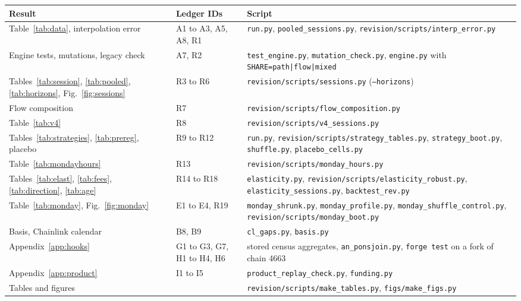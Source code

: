 \documentclass[11pt]{article}
\begin{document}
\begin{center}
\small
\begin{tabular}{>{\raggedright\arraybackslash}p{4.4cm}>{\raggedright\arraybackslash}p{2.2cm}>{\raggedright\arraybackslash}p{8.4cm}}
\toprule
Result & Ledger IDs & Script \\
\midrule
Table~\ref{tab:data}, interpolation error & A1 to A3, A5, A8, R1 & \texttt{run.py}, \texttt{pooled\_sessions.py}, \texttt{revision/scripts/interp\_error.py} \\
Engine tests, mutations, legacy check & A7, R2 & \texttt{test\_engine.py}, \texttt{mutation\_check.py}, \texttt{engine.py} with \texttt{SHARE=path|flow|mixed} \\
Tables~\ref{tab:session}, \ref{tab:pooled}, \ref{tab:horizons}, Fig.~\ref{fig:sessions} & R3 to R6 & \texttt{revision/scripts/sessions.py} (\texttt{--horizons}) \\
Flow composition & R7 & \texttt{revision/scripts/flow\_composition.py} \\
Table~\ref{tab:v4} & R8 & \texttt{revision/scripts/v4\_sessions.py} \\
Tables~\ref{tab:strategies}, \ref{tab:prereg}, placebo & R9 to R12 & \texttt{run.py}, \texttt{revision/scripts/strategy\_tables.py}, \texttt{strategy\_boot.py}, \texttt{shuffle.py}, \texttt{placebo\_cells.py} \\
Table~\ref{tab:mondayhours} & R13 & \texttt{revision/scripts/monday\_hours.py} \\
Tables~\ref{tab:elast}, \ref{tab:fees}, \ref{tab:direction}, \ref{tab:age} & R14 to R18 & \texttt{elasticity.py}, \texttt{revision/scripts/elasticity\_robust.py}, \texttt{elasticity\_sessions.py}, \texttt{backtest\_rev.py} \\
Table~\ref{tab:monday}, Fig.~\ref{fig:monday} & E1 to E4, R19 & \texttt{monday\_shrunk.py}, \texttt{monday\_profile.py}, \texttt{monday\_shuffle\_control.py}, \texttt{revision/scripts/monday\_boot.py} \\
Basis, Chainlink calendar & B8, B9 & \texttt{cl\_gaps.py}, \texttt{basis.py} \\
Appendix~\ref{app:hooks} & G1 to G3, G7, H1 to H4, H6 & stored census aggregates, \texttt{an\_ponsjoin.py}, \texttt{forge test} on a fork of chain 4663 \\
Appendix~\ref{app:product} & I1 to I5 & \texttt{product\_replay\_check.py}, \texttt{funding.py} \\
Tables and figures & & \texttt{revision/scripts/make\_tables.py}, \texttt{figs/make\_figs.py} \\
\bottomrule
\end{tabular}
\end{center}
\end{document}
